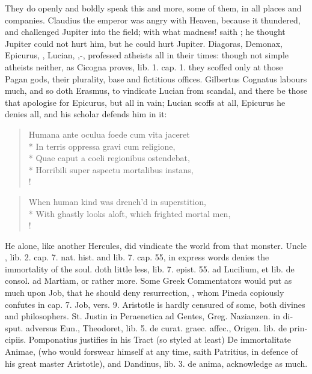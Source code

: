 {They do openly and boldly speak this and more, some of them, in all
places and companies. Claudius the emperor was angry with Heaven,
because it thundered, and challenged Jupiter into the field; with what
madness! saith \Seneca; he thought Jupiter could not hurt him, but he
could hurt Jupiter. Diagoras, Demonax, Epicurus, \Pliny{}, Lucian,
\Lucretius{},-, professed atheists all in
their times: though not simple atheists neither, as Cicogna proves,
lib. 1. cap. 1. they scoffed only at those Pagan gods, their plurality,
base and fictitious offices. Gilbertus Cognatus labours much, and so
doth Erasmus, to vindicate Lucian from scandal, and there be those that
apologise for Epicurus, but all in vain; Lucian scoffs at all, Epicurus
he denies all, and \Lucretius{} his scholar defends him in it:
%
\begin{latin}%
\begin{verse}%
Humana ante oculua foede cum vita jaceret\\*
In terris oppressa gravi cum religione,\\*
Quae caput a coeli regionibus ostendebat,\\*
Horribili super aspectu mortalibus instans, \etc{}\\!
\end{verse}%
\end{latin}%
\translationrule%
\begin{verse}%
When human kind was drench'd in superstition,\\*
With ghastly looks aloft, which frighted mortal men, \etc{}\\!
\end{verse}%
%

He alone, like another Hercules, did vindicate the world from that
monster. Uncle \Pliny{}, \textlatin{lib. 2. cap. 7. nat. hist.} and \textlatin{lib. 7. cap.
55}, in express words denies the immortality of the soul. \Seneca
doth little less, \textlatin{lib. 7. epist. 55. ad Lucilium, et lib. de consol. ad
Martiam}, or rather more. Some Greek Commentators would put as much upon
Job, that he should deny resurrection, \etc{}, whom Pineda copiously
confutes in \textlatin{cap. 7. Job, vers. 9.} Aristotle is hardly censured of some,
both divines and philosophers. St. Justin in \textlatin{Peraenetica ad Gentes},
Greg. Nazianzen. in \textlatin{disput. adversus Eun}., Theodoret, \textlatin{lib. 5. de curat.
graec. affec.}, Origen. \textlatin{lib. de principiis}. Pomponatius justifies in his
\textlatin{Tract} (so styled at least) \textlatin{De immortalitate Animae}, \Scaliger (who would
forswear himself at any time, saith Patritius, in defence of his great
master Aristotle), and Dandinus, \textlatin{lib. 3. de anima}, acknowledge as much.

}
